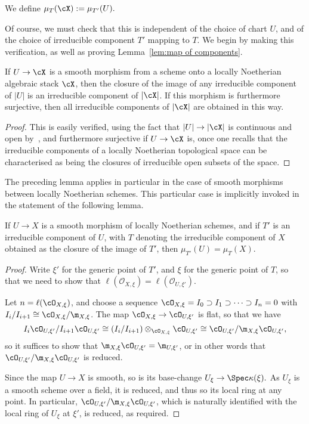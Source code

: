 \begin{adf} 
\label{def:multiplicity}
We define $\mu_T(\cX) := \mu_{T'}(U).$
\end{adf}

Of course, we must check that this is independent
of the choice of chart $U$, and of the choice 
of irreducible component $T'$ mapping to $T$.
We begin by making this verification, as well as
proving Lemma~\ref{lem:map of components}.



\begin{alemma}
\label{lem:map of components}
If $U \to \cX$ is a smooth morphism from a scheme
onto a locally Noetherian algebraic stack $\cX$, then the closure of the image of any irreducible
component of $|U|$ is an irreducible component of $|\cX|$.
If this morphism is furthermore surjective,
then all irreducible components of $|\cX|$ are obtained in this way.
\end{alemma}
\begin{proof}
This is easily verified, using the fact that $|U| \to |\cX|$ is
continuous and open by~\cite[\href{http://stacks.math.columbia.edu/tag/04XL}{Lem.~04XL}]{stacks-project}, and furthermore surjective if $U \to \cX$ is,
once one recalls that the irreducible components of a locally
Noetherian topological space can be
characterised as being the closures of irreducible open subsets of the space.
\end{proof}

The preceding lemma applies in particular in the case of smooth morphisms
between locally Noetherian schemes.    This particular case is
implicitly invoked in the statement of the following lemma.

\begin{alemma}
\label{lem:multiplicities}
If $U \to X$ is a smooth morphism of locally Noetherian schemes,
and if $T'$ is an irreducible component of $U$, with $T$ denoting
the irreducible component of $X$ obtained as the closure of the
image of $T'$, then $\mu_{T'}(U) = \mu_{T}(X).$
\end{alemma}
\begin{proof}Write $\xi'$ for the generic point of $T'$, and $\xi$ for the
  generic point of $T$, so that we need to show that $\ell(\mathcal
  O_{X,\xi})=\ell(\mathcal O_{U,\xi'})$.

  Let $n=\ell(\cO_{X,\xi})$, and choose a sequence $\cO_{X,\xi}=I_0\supset
  I_1\supset\dots\supset I_n=0$ with $I_i/I_{i+1}\cong
  \cO_{X,\xi}/\m_{X,\xi}$. The map $\cO_{X,\xi}\to\cO_{U,\xi'}$ is
  flat, so that we have \[I_i\cO_{U,\xi'}/I_{i+1}\cO_{U,\xi'}\cong
  (I_i/I_{i+1})\otimes_{\cO_{X,\xi}}\cO_{U,\xi'} \cong
  \cO_{U,\xi'}/\m_{X,\xi}\cO_{U,\xi'},\]so it suffices to show that
  $\m_{X,\xi}\cO_{U,\xi'}=\m_{U,\xi'}$, or in other words that
  $\cO_{U,\xi'}/\m_{X,\xi}\cO_{U,\xi'}$ is reduced.

Since the map $U\to X$ is smooth,
so is its base-change $U_{\xi} \to \Spec \kappa(\xi).$   As $U_{\xi}$ is a
smooth scheme over a field, it is reduced, and thus so its local ring
at any point.  In particular,
  $\cO_{U,\xi'}/\m_{X,\xi}\cO_{U,\xi'}$,
which is naturally identified with the local ring of $U_{\xi}$ at $\xi'$,
is reduced, as required.
\end{proof}

